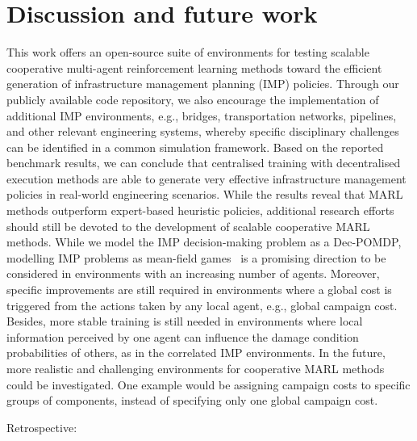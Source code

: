 \section{Discussion and future work}\label{sec:ch5_discusconclu}
This work offers an open-source suite of environments for testing scalable cooperative multi-agent reinforcement learning methods toward the efficient generation of infrastructure management planning (IMP) policies.
Through our publicly available code repository, we also encourage the implementation of additional IMP environments, e.g., bridges, transportation networks, pipelines, and other relevant engineering systems, whereby specific disciplinary challenges can be identified in a common simulation framework.
Based on the reported benchmark results, we can conclude that centralised training with decentralised execution methods are able to generate very effective infrastructure management policies in real-world engineering scenarios.
While the results reveal that MARL methods outperform expert-based heuristic policies, additional research efforts should still be devoted to the development of scalable cooperative MARL methods.
While we model the IMP decision-making problem as a Dec-POMDP, modelling IMP problems as mean-field games~\citep{lauriere2022learning} is a promising direction to be considered in environments with an increasing number of agents.
Moreover, specific improvements are still required in environments where a global cost is triggered from the actions taken by any local agent, e.g., global campaign cost.
Besides, more stable training is still needed in environments where local information perceived by one agent can influence the damage condition probabilities of others, as in the correlated IMP environments.
In the future, more realistic and challenging environments for cooperative MARL methods could be investigated.
One example would be assigning campaign costs to specific groups of components, instead of specifying only one global campaign cost.

Retrospective:



